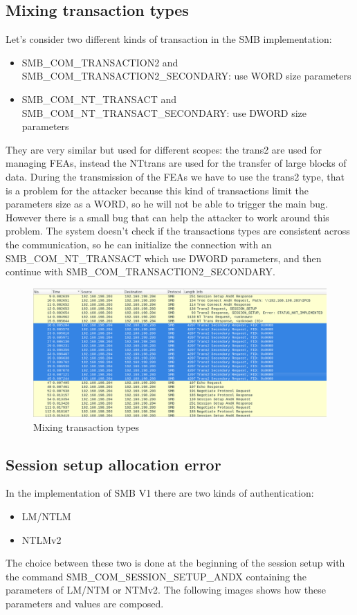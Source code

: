 \clearpage

\subsection{Mixing transaction types}
Let's consider two different kinds of transaction in the SMB implementation:
\begin{itemize}
  \item SMB\_COM\_TRANSACTION2 and SMB\_COM\_TRANSACTION2\_SECONDARY: use WORD size parameters
  \item SMB\_COM\_NT\_TRANSACT and SMB\_COM\_NT\_TRANSACT\_SECONDARY: use DWORD size parameters
\end{itemize}
They are very similar but used for different scopes: the trans2 are used for managing FEAs, instead the NTtrans are used for the 
transfer of large blocks of data.
During the transmission of the FEAs we have to use the trans2 type, that is a problem for the attacker because this kind of transactions limit
the parameters size as a WORD, so he will not be able to trigger the main bug.
However there is a small bug that can help the attacker to work around this problem. The system doesn't check if the transactions types are 
consistent across the communication, so he can initialize the connection with an SMB\_COM\_NT\_TRANSACT which use DWORD parameters, and then continue with SMB\_COM\_TRANSACTION2\_SECONDARY.

\begin{figure}[ht!]
  \centering
    \includegraphics[scale=0.35]{images/ws_trans2_requests.png}
    \caption{Mixing transaction types}
\end{figure}

\clearpage

\subsection{Session setup allocation error}
In the implementation of SMB V1 there are two kinds of authentication:
\begin{itemize}
  \item LM/NTLM
  \item NTLMv2
\end{itemize}
The choice between these two is done at the beginning of the session setup with the command
SMB\_COM\_SESSION\_SETUP\_ANDX containing the parameters of LM/NTM or NTMv2.
The following images shows how these parameters and values are composed.


